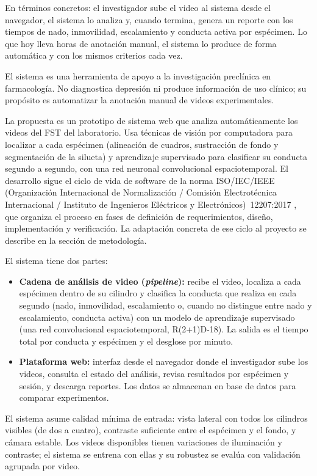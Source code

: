 En términos concretos: el investigador sube el video al sistema desde el navegador, el
sistema lo analiza y, cuando termina, genera un reporte con los tiempos de nado,
inmovilidad, escalamiento y conducta activa por espécimen. Lo que hoy lleva horas de
anotación manual, el sistema lo produce de forma automática y con los mismos criterios
cada vez.

El sistema es una herramienta de apoyo a la investigación preclínica en farmacología.
No diagnostica depresión ni produce información de uso clínico; su propósito es
automatizar la anotación manual de videos experimentales.

La propuesta es un prototipo de sistema web que analiza automáticamente los videos del
FST del laboratorio. Usa técnicas de visión por computadora para localizar a cada
espécimen (alineación de cuadros, sustracción de fondo y segmentación de la silueta) y
aprendizaje supervisado para clasificar su conducta segundo a segundo, con una red
neuronal convolucional espaciotemporal. El desarrollo sigue el ciclo de
vida de software de la norma ISO/IEC/IEEE (Organización Internacional de Normalización /
Comisión Electrotécnica Internacional / Instituto de Ingenieros Eléctricos y
Electrónicos)~12207:2017 \cite{iso12207}, que organiza el proceso en fases de definición
de requerimientos, diseño, implementación y verificación.
La adaptación concreta de ese ciclo al proyecto se describe en la sección de
metodología.

El sistema tiene dos partes:

\begin{itemize}
  \item \textbf{Cadena de análisis de video (\textit{pipeline}):} recibe el video, localiza a cada
        espécimen dentro de su cilindro y clasifica la conducta que realiza en cada segundo
        (nado, inmovilidad, escalamiento o, cuando no distingue entre nado y escalamiento, conducta activa) con un modelo de aprendizaje supervisado (una red convolucional
        espaciotemporal, R(2+1)D-18). La
        salida es el tiempo total por conducta y espécimen y el desglose por minuto.
  \item \textbf{Plataforma web:} interfaz desde el navegador donde el investigador sube
        los videos, consulta el estado del análisis, revisa resultados por espécimen y
        sesión, y descarga reportes. Los datos se almacenan en base de datos para
        comparar experimentos.
\end{itemize}

El sistema asume calidad mínima de entrada: vista lateral con todos los cilindros
visibles (de dos a cuatro), contraste suficiente entre el espécimen y el fondo, y cámara estable. Los videos
disponibles tienen variaciones de iluminación y contraste; el sistema se entrena con ellas
y su robustez se evalúa con validación agrupada por video.

